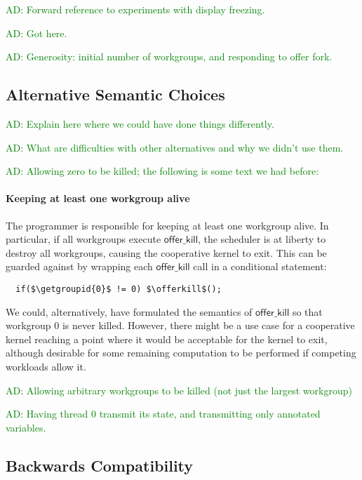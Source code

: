 \documentclass[nocopyrightspace,10pt]{sigplanconf}
\newcommand{\ADComment}[1]{\textcolor{green}{AD: #1}}
\newcommand{\offerkill}{\mathsf{offer\_kill}}
\newcommand{\getgroupid}{\mathsf{get\_group\_id}}
\begin{document}
\ADComment{Forward reference to experiments with display freezing.}

\ADComment{Got here.}

\ADComment{Generosity: initial number of workgroups, and responding to offer fork.}

\subsection{Alternative Semantic Choices}\label{sec:semanticalternatives}

\ADComment{Explain here where we could have done things differently.}

\ADComment{What are difficulties with other alternatives and why we didn't use them.}

\ADComment{Allowing zero to be killed; the following is some text we had before:}

\paragraph{Keeping at least one workgroup alive}

The programmer is responsible for keeping at least one workgroup alive.  In particular, if all workgroups execute $\offerkill$, the scheduler is at liberty to destroy all workgroups, causing the cooperative kernel to exit.  This can be guarded against by wrapping each $\offerkill$ call in a conditional statement:

\lstset{basicstyle=\tt}
\begin{lstlisting}
  if($\getgroupid{0}$ != 0) $\offerkill$();
\end{lstlisting}
\lstset{basicstyle=\scriptsize\tt}

We could, alternatively, have formulated the semantics of $\offerkill$
so that workgroup 0 is never killed.  However, there might be a use
case for a cooperative kernel reaching a point where it would be
acceptable for the kernel to exit, although desirable for some
remaining computation to be performed if competing workloads allow it.



\ADComment{Allowing arbitrary workgroups to be killed (not just the largest workgroup)}

\ADComment{Having thread 0 transmit its state, and transmitting only annotated variables.}

\subsection{Backwards Compatibility}\label{sec:backwardscompatibility}
\end{document}
